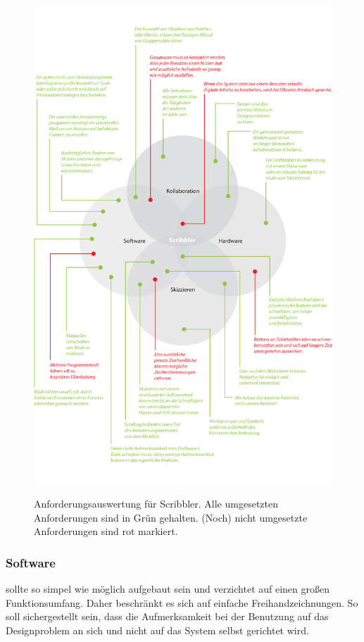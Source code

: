 \begin{figure}
	        {\includegraphics[bb=2cm 0cm 14.39cm 23.01cm]{gfx/scribblerAnforderungsauswertung}}
		\caption[Anforderungsauswertung für Scribbler]{Anforderungsauswertung für Scribbler. Alle umgesetzten Anforderungen sind in Grün gehalten. (Noch) nicht umgesetzte Anforderungen sind rot markiert.}\label{fig:scribblerAnforderungsauswertung}
\end{figure}

\subsubsection*{Software}
\scribbler sollte so simpel wie möglich aufgebaut sein und verzichtet auf einen großen Funktionsumfang. Daher beschränkt es sich auf einfache Freihandzeichnungen. So soll sichergestellt sein, dass die Aufmerksamkeit bei der Benutzung auf das Designproblem an sich und nicht auf das System selbst gerichtet wird. 

